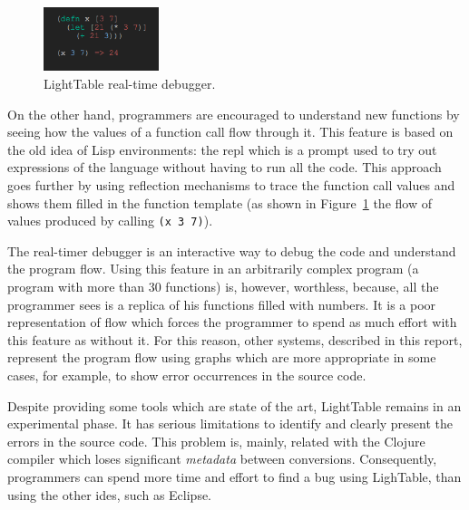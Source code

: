 \begin{figure}
  \vspace{-25pt}
  \begin{center}
    \includegraphics[width=0.3\textwidth]{img/eval-close}
  \end{center}
  \vspace{-20pt}
 \caption{LightTable real-time debugger.}  
  \vspace{-20pt}
    \label{fig:lt2}
\end{figure}

On the other hand, programmers are encouraged to understand new functions by seeing how the values of a function call flow through it. This feature is based on the old idea of Lisp environments: the \ac{repl} which is a prompt used to try out expressions of the language without having to run all the code. This approach goes further by using reflection mechanisms to trace the function call values and shows them filled in the function template (as shown in Figure~\ref{fig:lt2} the flow of values produced by calling \texttt{(x 3 7)}).

The real-timer debugger is an interactive way to debug the code and understand the program flow. Using this feature in an arbitrarily complex program (a program with more than 30 functions) is, however, worthless, because, all the programmer sees is a replica of his functions filled with numbers. It is a poor representation of flow which forces the programmer to spend as much effort with this feature as without it. For this reason, other systems, described in this report, represent the program flow using graphs which are more appropriate in some cases, for example, to show error occurrences in the source code.

Despite providing some tools which are state of the art, LightTable remains in an experimental phase. It has serious limitations to identify and clearly present the errors in the source code. This problem is, mainly, related with the Clojure compiler which loses significant \textit{metadata} between conversions. Consequently, programmers can spend more time and effort to find a bug using LighTable, than using the other \ac{ide}s, such as Eclipse.
